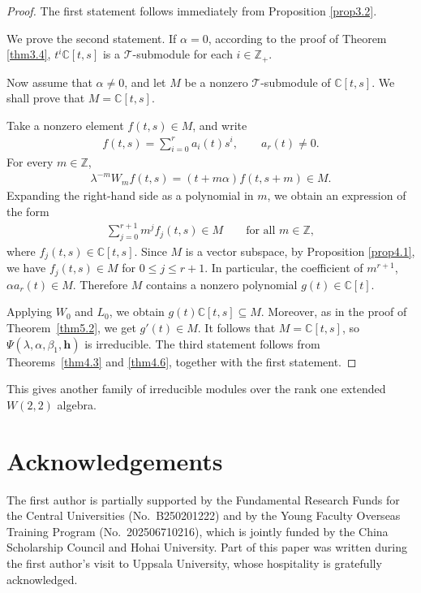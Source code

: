 \documentclass[a4paper]{amsart}
\numberwithin{equation}{section}
\begin{document}
\begin{proof}
The first statement follows immediately from Proposition \ref{prop3.2}. 

We prove the second statement. If $\alpha=0$, according to the proof of Theorem \ref{thm3.4}, $t^{i}\mathbb C[t,s]$ is a
$\mathcal T$-submodule for each $i\in \mathbb{Z}_{+}$.

Now assume that $\alpha\neq 0$, and let $M$ be a nonzero $\mathcal T$-submodule of
$\mathbb C[t,s]$. We shall prove that $M=\mathbb C[t,s]$.

Take a nonzero element $f(t,s)\in M$, and write
\begin{align*}
f(t,s)=\sum_{i=0}^r a_i(t)s^i,
\qquad a_r(t)\neq 0.
\end{align*}
For every $m\in\mathbb Z$,
\begin{align*}
\lambda^{-m}W_m f(t,s)=(t+m\alpha)f(t,s+m)\in M.
\end{align*}
Expanding the right-hand side as a polynomial in $m$, we obtain an expression of the form
\begin{align*}
\sum_{j=0}^{r+1} m^j f_j(t,s)\in M
\qquad \text{for all }m\in\mathbb Z,
\end{align*}
where $f_j(t,s)\in \mathbb C[t,s]$. Since $M$ is a vector subspace, by Proposition \ref{prop4.1},
we have $f_j(t,s)\in M$ for $0\le j\le r+1$. In particular,
the coefficient of $m^{r+1}$,  $\alpha a_r(t)\in M$.
Therefore $M$ contains a nonzero polynomial $g(t)\in \mathbb C[t]$.

Applying $W_0$ and $L_0$, we obtain $g(t)\mathbb C[t,s]\subseteq M$.
Moreover, as in the proof of Theorem~\ref{thm5.2}, 
we get $g'(t)\in M$.
It follows that $M=\mathbb C[t,s]$, so $\Psi(\lambda,\alpha,\beta_1,\mathbf h)$ is irreducible.
The third statement follows from Theorems~\ref{thm4.3} and \ref{thm4.6}, together with the first statement.
\end{proof}
This gives another family of irreducible modules over the rank one extended $W(2,2)$ algebra.

\section*{Acknowledgements}
The first author is partially supported by the Fundamental Research Funds for the Central Universities (No.~B250201222) and by the Young Faculty Overseas 
Training Program (No.~202506710216), which is jointly funded by the China Scholarship Council and Hohai University.
Part of this paper was written during the first author's visit to Uppsala University, whose hospitality is gratefully acknowledged.
\end{document}
